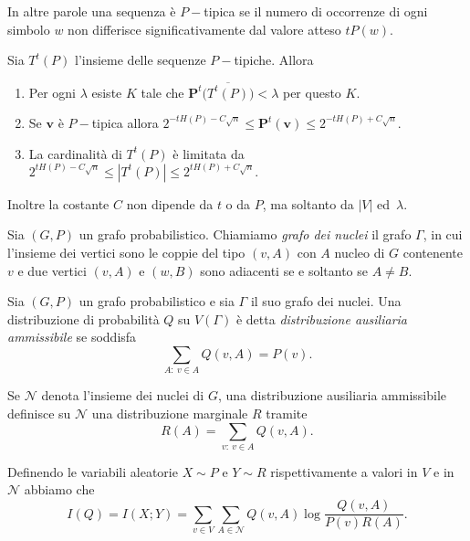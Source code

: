 In altre parole una sequenza è \(P-\)tipica se il numero di occorrenze di ogni simbolo \(w\) non differisce significativamente dal valore atteso \(tP(w)\). 
\begin{lemma}
	\label{ptyplemma} Sia \(T^t(P)\) l'insieme delle sequenze \(P-\)tipiche. Allora 
	\begin{enumerate}
		\item Per ogni \(\lambda\) esiste \(K\) tale che \(\mathbf{P}^t\big(\overline{T^{t}(P)}\big)<\lambda\) per questo \(K\). 
		\item Se \(\mathbf{v}\) è \(P-\)tipica allora \(2^{-tH(P)-C\sqrt{n}}\le \mathbf{P}^t(\mathbf{v})\le2^{-tH(P)+C\sqrt{n}}.\) 
		\item La cardinalità di \(T^{t}(P)\) è limitata da \(2^{tH(P)-C\sqrt{n}}\le |T^{t}(P)|\le 2^{tH(P)+C\sqrt{n}}.\) 
	\end{enumerate}
	Inoltre la costante \(C\) non dipende da \(t\) o da \(P\), ma soltanto da \(|V|\) ed\ \(\lambda\). 
\end{lemma}
\begin{definition}
	Sia \((G,P)\) un grafo probabilistico. Chiamiamo \emph{grafo dei nuclei} il grafo \(\Gamma\), in cui l'insieme dei vertici sono le coppie del tipo \((v,A)\) con \(A\) nucleo di \(G\) contenente \(v\) e due vertici \((v,A)\) e \((w,B)\) sono adiacenti se e soltanto se \(A\neq B\). 
\end{definition}
\begin{definition}
	Sia \((G,P)\) un grafo probabilistico e sia \(\Gamma\) il suo grafo dei nuclei. Una distribuzione di probabilità \(Q\) su \(V(\Gamma)\) è detta \emph{distribuzione ausiliaria ammissibile} se soddisfa 
	\begin{equation}
		\label{eq:preimage} \sum_{A:\ v\in A} Q(v,A) = P(v). 
	\end{equation}
\end{definition}

Se \(\mathcal{N}\) denota l'insieme dei nuclei di \(G\), una distribuzione ausiliaria ammissibile definisce su \(\mathcal{N}\) una distribuzione marginale \(R\) tramite 
\begin{equation}
	\label{eq:margdist} R(A)=\sum_{v:\ v\in A} Q(v,A). 
\end{equation}

Definendo le variabili aleatorie \(X\sim P\) e \(Y\sim R\) rispettivamente a valori in \(V\) e in \(\mathcal{N}\) abbiamo che 
\begin{equation}
	\label{eq:continuous} I(Q)=I(X;Y)=\sum_{v\in V}\sum_{A\in \mathcal{N}} Q(v,A)\log{\frac{Q(v,A)}{P(v)R(A)}}. 
\end{equation}

